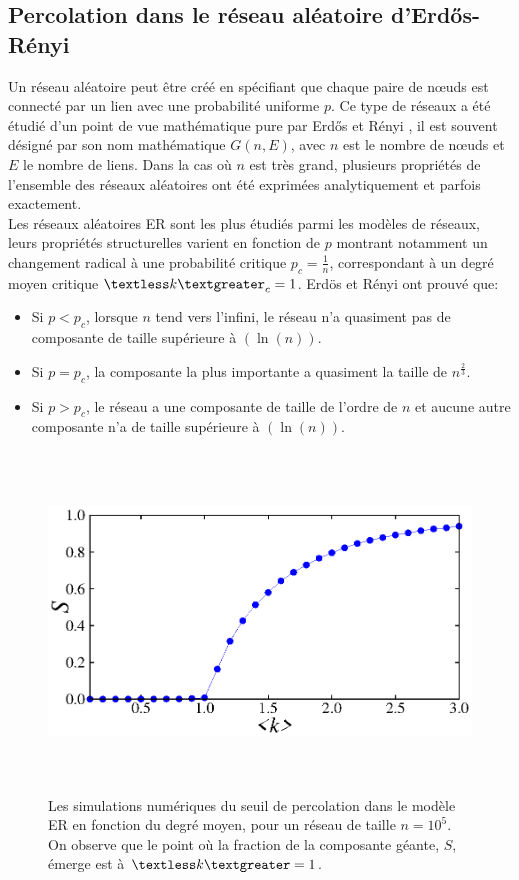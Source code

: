 \subsection{Percolation dans le réseau aléatoire d'Erd\H{o}s-Rényi}
Un réseau aléatoire peut être créé en spécifiant que chaque paire de nœuds est connecté par un lien avec une probabilité uniforme $p$. Ce type de réseaux a été étudié d'un point de vue mathématique pure par Erd\H{o}s et Rényi \cite{Erdos-Renyi1959,Erdos-Renyi1960,Erdos-Renyi1961}, il est souvent désigné par son nom mathématique $G(n,E)$, avec $n$ est le nombre de nœuds et $E$ le nombre de liens. 
Dans la cas où $n$ est très grand, plusieurs propriétés de l'ensemble des réseaux aléatoires ont été exprimées analytiquement et parfois exactement.\\
Les réseaux aléatoires ER sont les plus étudiés parmi les modèles de réseaux, leurs propriétés structurelles varient en fonction de $p$ montrant notamment un changement radical à une probabilité critique $p_c=\frac{1}{n}$,
correspondant à un degré moyen critique $\textless k \textgreater_c=1$. Erdös et Rényi ont prouvé que:\\
\begin{itemize}
	\item Si $p <p_c$, lorsque $n$ tend vers l'infini, le réseau n'a quasiment pas de composante de taille  
	supérieure à $(\ln(n))$.
	\item Si $p=p_c$, la composante la plus importante a quasiment la taille de $n^{\frac{2}{3}}$.
	\item Si $p> p_c$, le réseau a une composante de taille de l'ordre de $n$ et aucune autre composante n'a de taille supérieure à $(\ln(n))$.
\end{itemize}
\begin{figure}[h!]
	\centering
	\includegraphics[width=12cm,height=9cm]{./figures/fig-ER-CG}
	\caption{Les simulations numériques du seuil de percolation dans le modèle ER en fonction du degré moyen, pour un réseau de taille $n=10^5$. On observe que le point où la fraction de la composante géante, $S$, émerge est à $\textless k\textgreater=1$.}
	
	\label{percolation-graph}
\end{figure}

